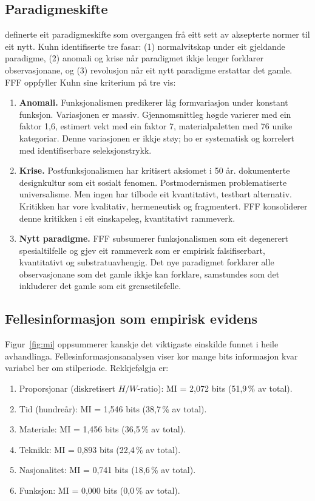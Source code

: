 \documentclass[12pt, a4paper]{article}
\begin{document}
\subsection{Paradigmeskifte}

\citet{kuhn1962} definerte eit paradigmeskifte som overgangen frå eitt sett av aksepterte normer til eit nytt. Kuhn identifiserte tre fasar: (1) normalvitskap under eit gjeldande paradigme, (2) anomali og krise når paradigmet ikkje lenger forklarer observasjonane, og (3) revolusjon når eit nytt paradigme erstattar det gamle. FFF oppfyller Kuhn sine kriterium på tre vis:

\begin{enumerate}
  \item \textbf{Anomali.} Funksjonalismen predikerer låg formvariasjon under konstant funksjon. Variasjonen er massiv. Gjennomsnittleg høgde varierer med ein faktor 1,6, estimert vekt med ein faktor 7, materialpaletten med 76 unike kategoriar. Denne variasjonen er ikkje støy; ho er systematisk og korrelert med identifiserbare seleksjonstrykk.
  \item \textbf{Krise.} Postfunksjonalismen har kritisert aksiomet i 50 år. \citet{sparke2004} dokumenterte designkultur som eit sosialt fenomen. Postmodernismen problematiserte universalisme. Men ingen har tilbode eit kvantitativt, testbart alternativ. Kritikken har vore kvalitativ, hermeneutisk og fragmentert. FFF konsoliderer denne kritikken i eit einskapeleg, kvantitativt rammeverk.
  \item \textbf{Nytt paradigme.} FFF subsumerer funksjonalismen som eit degenerert spesialtilfelle og gjev eit rammeverk som er empirisk falsifiserbart, kvantitativt og substratuavhengig. Det nye paradigmet forklarer alle observasjonane som det gamle ikkje kan forklare, samstundes som det inkluderer det gamle som eit grensetilefelle.
\end{enumerate}

\subsection{Fellesinformasjon som empirisk evidens}

Figur~\ref{fig:mi} oppsummerer kanskje det viktigaste einskilde funnet i heile avhandlinga. Fellesinformasjonsanalysen viser kor mange bits informasjon kvar variabel ber om stilperiode. Rekkjefølgja er:

\begin{enumerate}
  \item Proporsjonar (diskretisert $H/W$-ratio): MI = 2,072 bits (51,9\,\% av total).
  \item Tid (hundreår): MI = 1,546 bits (38,7\,\% av total).
  \item Materiale: MI = 1,456 bits (36,5\,\% av total).
  \item Teknikk: MI = 0,893 bits (22,4\,\% av total).
  \item Nasjonalitet: MI = 0,741 bits (18,6\,\% av total).
  \item Funksjon: MI = 0,000 bits (0,0\,\% av total).
\end{enumerate}
\end{document}
